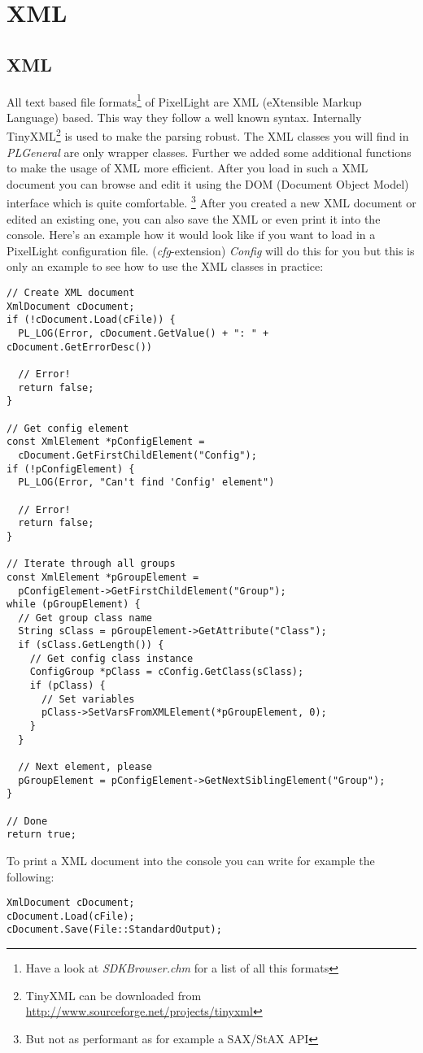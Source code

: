 \chapter{XML}




\section{XML}
All text based file formats\footnote{Have a look at \emph{SDKBrowser.chm} for a list of all this formats} of PixelLight are XML (eXtensible Markup Language) based. This way they follow a well known syntax. Internally TinyXML\footnote{TinyXML can be downloaded from \url{http://www.sourceforge.net/projects/tinyxml}} is used to make the parsing robust. The XML classes you will find in \emph{PLGeneral} are only wrapper classes. Further we added some additional functions to make the usage of XML more efficient. After you load in such a XML document you can browse and edit it using the DOM (Document Object Model) interface which is quite comfortable. \footnote{But not as performant as for example a SAX/StAX API} After you created a new XML document or edited an existing one, you can also save the XML or even print it into the console. Here's an example how it would look like if you want to load in a PixelLight configuration file. (\emph{cfg}-extension) \emph{Config} will do this for you but this is only an example to see how to use the XML classes in practice:

\begin{lstlisting}[caption=XML DOM usage example]
// Create XML document
XmlDocument cDocument;
if (!cDocument.Load(cFile)) {
  PL_LOG(Error, cDocument.GetValue() + ": " + cDocument.GetErrorDesc())

  // Error!
  return false;
}

// Get config element
const XmlElement *pConfigElement =
  cDocument.GetFirstChildElement("Config");
if (!pConfigElement) {
  PL_LOG(Error, "Can't find 'Config' element")

  // Error!
  return false;
}

// Iterate through all groups
const XmlElement *pGroupElement =
  pConfigElement->GetFirstChildElement("Group");
while (pGroupElement) {
  // Get group class name
  String sClass = pGroupElement->GetAttribute("Class");
  if (sClass.GetLength()) {
    // Get config class instance
    ConfigGroup *pClass = cConfig.GetClass(sClass);
    if (pClass) {
      // Set variables
      pClass->SetVarsFromXMLElement(*pGroupElement, 0);
    }
  }

  // Next element, please
  pGroupElement = pConfigElement->GetNextSiblingElement("Group");
}

// Done
return true;
\end{lstlisting}

To print a XML document into the console you can write for example the following:

\begin{lstlisting}[caption=Print XML document into the console]
XmlDocument cDocument;
cDocument.Load(cFile);
cDocument.Save(File::StandardOutput);
\end{lstlisting}
